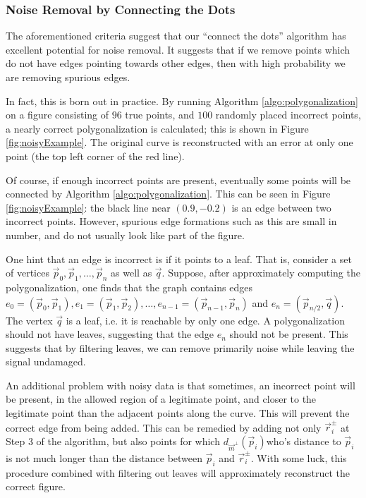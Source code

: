 \documentclass{article}
\numberwithin{cntr}{section}
\numberwithin{equation}{section}
\newcommand{\vp}[0]{{\vec{p}}}
\newcommand{\vq}[0]{{\vec{q}}}
\newcommand{\vr}[0]{{\vec{r}}}
\newcommand{\vm}[0]{{\vec{m}}}
\begin{document}
\subsubsection{Noise Removal by Connecting the Dots}

The aforementioned criteria suggest that our ``connect the dots'' algorithm has excellent potential for noise removal. It suggests that if we remove points which do not have edges pointing towards other edges, then with high probability we are removing spurious edges.

In fact, this is born out in practice. By running Algorithm \ref{algo:polygonalization} on a figure consisting of $96$ true points, and $100$ randomly placed incorrect points, a nearly correct polygonalization is calculated; this is shown in Figure \ref{fig:noisyExample}. The original curve is reconstructed with an error at only one point (the top left corner of the red line).

Of course, if enough incorrect points are present, eventually some points will be connected by Algorithm \ref{algo:polygonalization}. This can be seen in Figure \ref{fig:noisyExample}: the black line near $(0.9, -0.2)$ is an edge between two incorrect points. However, spurious edge formations such as this are small in number, and do not usually look like part of the figure.

One hint that an edge is incorrect is if it points to a leaf. That is, consider a set of vertices $\vp_{0}, \vp_{1}, \ldots, \vp_{n}$ as well as $\vq$. Suppose, after approximately computing the polygonalization, one finds that the graph contains edges $e_{0} = (\vp_{0}, \vp_{1}), e_{1} = (\vp_{1}, \vp_{2}), \ldots, e_{n-1} = (\vp_{n-1}, \vp_{n})$ and $e_{n} = (\vp_{n/2}, \vq)$. The vertex $\vq$ is a leaf, i.e. it is reachable by only one edge. A polygonalization should not have leaves, suggesting that the edge $e_{n}$ should not be present. This suggests that by filtering leaves, we can remove primarily noise while leaving the signal undamaged.

An additional problem with noisy data is that sometimes, an incorrect point will be present, in the allowed region of a legitimate point, and closer to the legitimate point than the adjacent points along the curve. This will prevent the correct edge from being added. This can be remedied by adding not only $\vr_{i}^{\pm}$ at Step 3 of the algorithm, but also points for which $d_{\vm^{\perp}}(\vp_{i})$who's distance to $\vp_{i}$ is not much longer than the distance between $\vp_{i}$ and $\vr_{i}^{\pm}$. With some luck, this procedure combined with filtering out leaves will approximately reconstruct the correct figure.
\end{document}
